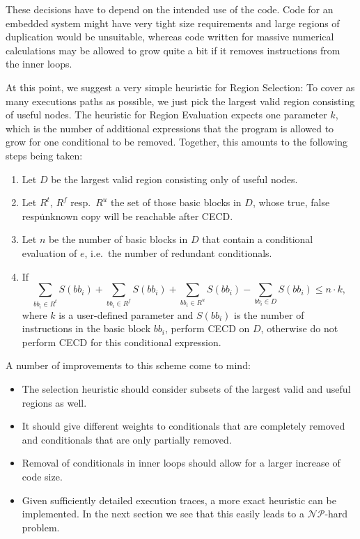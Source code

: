 \documentclass[halfparskip]{scrartcl}
\begin{document}
These decisions have to depend on the intended use of the code. Code for an embedded system might have very tight size requirements and large regions of duplication would be unsuitable, whereas code written for massive numerical calculations may be allowed to grow quite a bit if it removes instructions from the inner loops.

At this point, we suggest a very simple heuristic for Region Selection: To cover as many executions paths as possible, we just pick the largest valid region consisting of useful nodes. The heuristic for Region Evaluation expects one parameter $k$, which is the number of additional expressions that the program is allowed to grow for one conditional to be removed. Together, this amounts to the following steps being taken:

\begin{enumerate}
\item Let $D$ be the largest valid region consisting only of useful nodes.
\item Let $R^t$, $R^f$ resp.\ $R^u$ the set of those basic blocks in $D$, whose true, false resp\. unknown copy will be reachable after CECD.
\item Let $n$ be the number of basic blocks in $D$ that contain a conditional evaluation of $e$, i.e.\ the number of redundant conditionals.
\item If
\[
\sum_{bb_i\in R^t} S(bb_i) + 
\sum_{bb_i\in R^f} S(bb_i) + 
\sum_{bb_i\in R^u} S(bb_i) - 
\sum_{bb_i\in D} S(bb_i) \le n \cdot k,
\]
where $k$ is a user-defined parameter and $S(bb_i)$ is the number of instructions in the basic block $bb_i$, perform CECD on $D$, otherwise do not perform CECD for this conditional expression.
\end{enumerate}

A number of improvements to this scheme come to mind:
\begin{itemize}
\item The selection heuristic should consider subsets of the largest valid and useful regions as well.
\item It should give different weights to conditionals that are completely removed and conditionals that are only partially removed.
\item Removal of conditionals in inner loops should allow for a larger increase of code size.
\item Given sufficiently detailed execution traces, a more exact heuristic can be implemented. In the next section we see that this easily leads to a $\mathcal{NP}$-hard problem.
\end{itemize}
\end{document}
